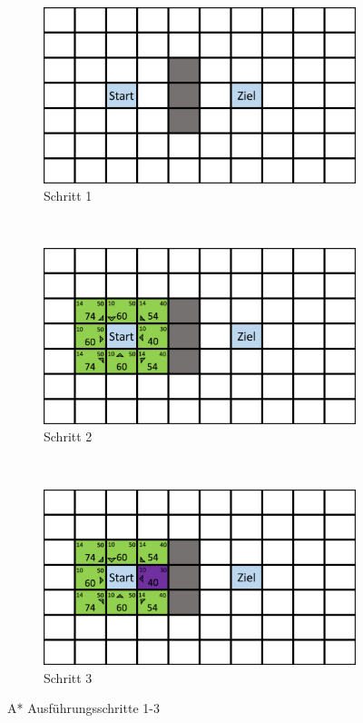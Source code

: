 \begin{figure}[H]
    \centering
    \begin{subfigure}[b]{0.3\textwidth}
        \includegraphics[width=\textwidth]{assets/aStarStep0.png}
        \caption{Schritt 1}
        \label{fig:aStartStep1}
    \end{subfigure}
    ~ %
    \begin{subfigure}[b]{0.3\textwidth}
        \includegraphics[width=\textwidth]{assets/aStarStep1.png}
        \caption{Schritt 2}
        \label{fig:aStartStep2}
    \end{subfigure}
    ~
    \begin{subfigure}[b]{0.3\textwidth}
        \includegraphics[width=\textwidth]{assets/aStarStep2.png}
        \caption{Schritt 3}
        \label{fig:aStartStep3}
    \end{subfigure}
    \caption{A* Ausführungsschritte 1-3}\label{fig:aStarStep1_3}
\end{figure}

